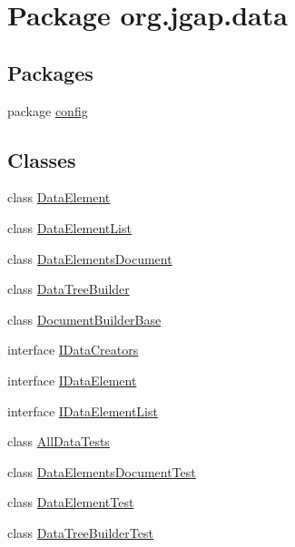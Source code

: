 \hypertarget{namespaceorg_1_1jgap_1_1data}{\section{Package org.\-jgap.\-data}
\label{namespaceorg_1_1jgap_1_1data}
}
\subsection*{Packages}
\begin{DoxyCompactItemize}
\item 
package \hyperlink{namespaceorg_1_1jgap_1_1data_1_1config}{config}
\end{DoxyCompactItemize}
\subsection*{Classes}
\begin{DoxyCompactItemize}
\item 
class \hyperlink{classorg_1_1jgap_1_1data_1_1_data_element}{Data\-Element}
\item 
class \hyperlink{classorg_1_1jgap_1_1data_1_1_data_element_list}{Data\-Element\-List}
\item 
class \hyperlink{classorg_1_1jgap_1_1data_1_1_data_elements_document}{Data\-Elements\-Document}
\item 
class \hyperlink{classorg_1_1jgap_1_1data_1_1_data_tree_builder}{Data\-Tree\-Builder}
\item 
class \hyperlink{classorg_1_1jgap_1_1data_1_1_document_builder_base}{Document\-Builder\-Base}
\item 
interface \hyperlink{interfaceorg_1_1jgap_1_1data_1_1_i_data_creators}{I\-Data\-Creators}
\item 
interface \hyperlink{interfaceorg_1_1jgap_1_1data_1_1_i_data_element}{I\-Data\-Element}
\item 
interface \hyperlink{interfaceorg_1_1jgap_1_1data_1_1_i_data_element_list}{I\-Data\-Element\-List}
\item 
class \hyperlink{classorg_1_1jgap_1_1data_1_1_all_data_tests}{All\-Data\-Tests}
\item 
class \hyperlink{classorg_1_1jgap_1_1data_1_1_data_elements_document_test}{Data\-Elements\-Document\-Test}
\item 
class \hyperlink{classorg_1_1jgap_1_1data_1_1_data_element_test}{Data\-Element\-Test}
\item 
class \hyperlink{classorg_1_1jgap_1_1data_1_1_data_tree_builder_test}{Data\-Tree\-Builder\-Test}
\end{DoxyCompactItemize}
